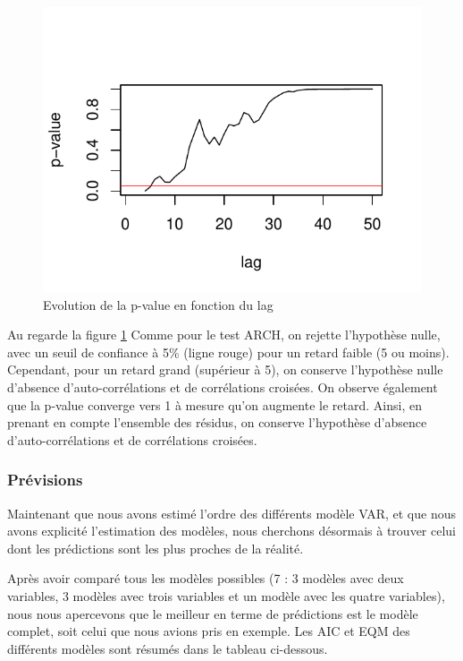 \documentclass[11pt,]{article}
\begin{document}
\begin{figure}[htbp]
\centering
\includegraphics{doc_files/figure-latex/unnamed-chunk-42-1.pdf}
\caption{\label{fig26} Evolution de la p-value en fonction du lag}
\end{figure}

Au regarde la figure \ref{fig26} Comme pour le test ARCH, on rejette
l'hypothèse nulle, avec un seuil de confiance à 5\% (ligne rouge) pour
un retard faible (5 ou moins). Cependant, pour un retard grand
(supérieur à 5), on conserve l'hypothèse nulle d'absence
d'auto-corrélations et de corrélations croisées. On observe également
que la p-value converge vers 1 à mesure qu'on augmente le retard. Ainsi,
en prenant en compte l'ensemble des résidus, on conserve l'hypothèse
d'absence d'auto-corrélations et de corrélations croisées.

\subsubsection{Prévisions}\label{previsions}

Maintenant que nous avons estimé l'ordre des différents modèle VAR, et
que nous avons explicité l'estimation des modèles, nous cherchons
désormais à trouver celui dont les prédictions sont les plus proches de
la réalité.

Après avoir comparé tous les modèles possibles (7 : 3 modèles avec deux
variables, 3 modèles avec trois variables et un modèle avec les quatre
variables), nous nous apercevons que le meilleur en terme de prédictions
est le modèle complet, soit celui que nous avions pris en exemple. Les
AIC et EQM des différents modèles sont résumés dans le tableau
ci-dessous.
\end{document}
